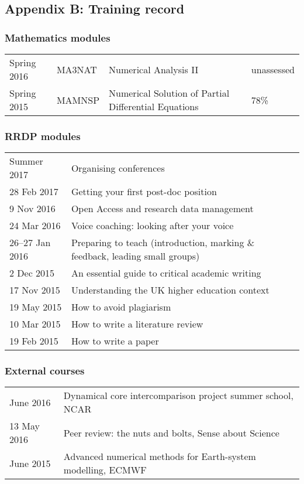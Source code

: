 \documentclass[a4paper,11pt]{article}
\begin{document}
\subsection*{Appendix B: Training record}

\subsubsection*{Mathematics modules}
\footnotesize
\begin{tabular}{l l l l}
Spring 2016	& MA3NAT & Numerical Analysis II & unassessed \\
Spring 2015	& MAMNSP & Numerical Solution of Partial Differential Equations  & 78\% \\
\end{tabular}

\subsubsection*{RRDP modules}
\begin{tabular}{l l}
Summer 2017	& Organising conferences \\
28 Feb 2017	& Getting your first post-doc position \\
9 Nov 2016      & Open Access and research data management \\
24 Mar 2016	& Voice coaching: looking after your voice \\
26--27 Jan 2016 & Preparing to teach (introduction, marking \& feedback, leading small groups) \\
2 Dec 2015	& An essential guide to critical academic writing \\
17 Nov 2015	& Understanding the UK higher education context \\
19 May 2015	& How to avoid plagiarism \\
10 Mar 2015	& How to write a literature review \\
19 Feb 2015	& How to write a paper \\
\end{tabular}

\subsubsection*{External courses}
\begin{tabular}{l l}
June 2016 & Dynamical core intercomparison project summer school, NCAR \\
13 May 2016 & Peer review: the nuts and bolts, Sense about Science \\
June 2015 & Advanced numerical methods for Earth-system modelling, ECMWF \\
\end{tabular}
\end{document}
